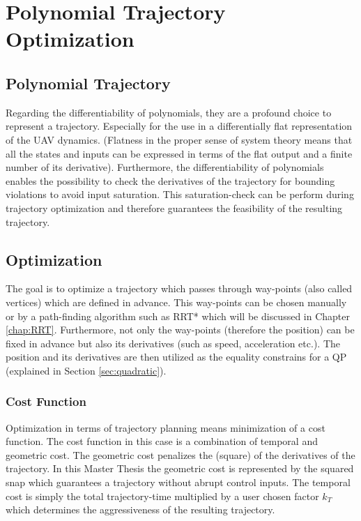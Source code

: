 \chapter{Polynomial Trajectory Optimization}\label{sec:trajectory}


\section{Polynomial Trajectory}\label{sec:polynomial}

Regarding the differentiability of polynomials, they are a profound choice to represent a trajectory. Especially for the use in a differentially flat representation of the UAV dynamics. (Flatness in the proper sense of system theory means that all the states and inputs can be expressed in terms of the flat output and a finite number of its derivative). \newline
Furthermore, the differentiability of polynomials enables the possibility to check the derivatives of the trajectory for bounding violations to avoid input saturation. This saturation-check can be perform during trajectory optimization and therefore guarantees the feasibility of the resulting trajectory.

\section{Optimization}\label{sec:optimization}

The goal is to optimize a trajectory which passes through way-points (also called vertices) which are defined in advance. This way-points can be chosen manually or by a path-finding algorithm such as RRT* which will be discussed in Chapter \ref{chap:RRT}.
Furthermore, not only the way-points (therefore the position) can be fixed in advance but also its derivatives (such as speed, acceleration etc.). The position and its derivatives are then utilized as the equality constrains for a QP (explained in Section \ref{sec:quadratic}).

\subsection{Cost Function}\label{sec:cost}

Optimization in terms of trajectory planning means minimization of a cost function. The cost function in this case is a combination of temporal and geometric cost. The geometric cost penalizes the (square) of the derivatives of the trajectory. In this Master Thesis the geometric cost is represented by the squared snap which guarantees a trajectory without abrupt  control inputs. \newline
The temporal cost is simply the total trajectory-time multiplied by a user chosen factor $k_T$ which determines the aggressiveness of the resulting trajectory. \newline

